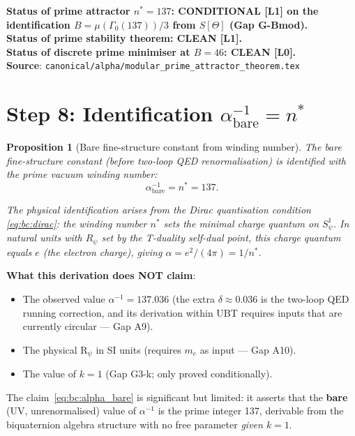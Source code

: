 \documentclass[12pt,a4paper]{article}
\newtheorem{proposition}[theorem]{Proposition}
\theoremstyle{definition}
\theoremstyle{remark}
\begin{document}
\begin{resultbox}
\textbf{Status of prime attractor $n^* = 137$: CONDITIONAL [L1] on the
identification $B = \mu(\Gamma_0(137))/3$ from $S[\Theta]$ (Gap G-Bmod).}\\
\textbf{Status of prime stability theorem: CLEAN [L1].}\\
\textbf{Status of discrete prime minimiser at $B = 46$: CLEAN [L0].}\\
\textbf{Source}: \texttt{canonical/alpha/modular\_prime\_attractor\_theorem.tex}
\end{resultbox}

\section{Step 8: Identification $\alpha^{-1}_{\mathrm{bare}} = n^*$}
\label{sec:bc:identification}

\begin{proposition}[Bare fine-structure constant from winding number]
\label{prop:bc:alpha_id}
The bare fine-structure constant (before two-loop QED renormalisation) is
identified with the prime vacuum winding number:
\begin{equation}
  \alpha^{-1}_{\mathrm{bare}} = n^* = 137.
  \label{eq:bc:alpha_bare}
\end{equation}

The physical identification arises from the Dirac quantisation condition
\eqref{eq:bc:dirac}: the winding number $n^*$ sets the minimal charge quantum
on $S^1_\psi$.  In natural units with $R_\psi$ set by the T-duality self-dual
point, this charge quantum equals $e$ (the electron charge), giving
$\alpha = e^2/(4\pi) = 1/n^*$.
\end{proposition}

\begin{warnbox}
\textbf{What this derivation does NOT claim}:
\begin{itemize}
  \item The observed value $\alpha^{-1} = 137.036$ (the extra $\delta \approx 0.036$
        is the two-loop QED running correction, and its derivation within UBT
        requires inputs that are currently circular — Gap A9).
  \item The physical R$_\psi$ in SI units (requires $m_e$ as input — Gap A10).
  \item The value of $k = 1$ (Gap G3-k; only proved conditionally).
\end{itemize}
The claim~\eqref{eq:bc:alpha_bare} is significant but limited: it asserts that
the \textbf{bare} (UV, unrenormalised) value of $\alpha^{-1}$ is the prime integer
137, derivable from the biquaternion algebra structure with no free parameter
\emph{given $k = 1$}.
\end{warnbox}
\end{document}
